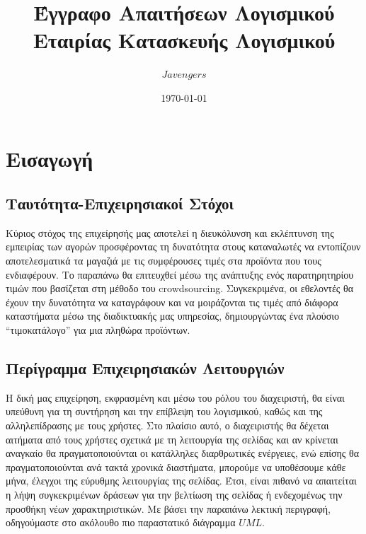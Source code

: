 \documentclass[12pt]{article}
\begin{document}
\title{Έγγραφο Απαιτήσεων Λογισμικού \\ Eταιρίας Kατασκευής Λογισμικού}
\date{\today}
\author{$Javengers$}
\maketitle

\tableofcontents

\section{Εισαγωγή}

\subsection{Ταυτότητα-Επιχειρησιακοί Στόχοι}

Κύριος στόχος της επιχείρησής μας αποτελεί η διευκόλυνση και εκλέπτυνση της εμπειρίας των αγορών προσφέροντας τη δυνατότητα στους καταναλωτές να εντοπίζουν αποτελεσματικά τα μαγαζιά με τις συμφέρουσες τιμές στα προϊόντα που τους ενδιαφέρουν. Το παραπάνω θα επιτευχθεί μέσω της ανάπτυξης ενός παρατηρητηρίου τιμών που βασίζεται στη μέθοδο του crowdsourcing. Συγκεκριμένα, οι εθελοντές θα έχουν την δυνατότητα να καταγράφουν και να μοιράζονται τις τιμές από διάφορα καταστήματα μέσω της διαδικτυακής μας υπηρεσίας, δημιουργώντας ένα πλούσιο “τιμοκατάλογο” για μια πληθώρα προϊόντων.

\subsection{Περίγραμμα Επιχειρησιακών Λειτουργιών}

Η δική μας επιχείρηση, εκφρασμένη και μέσω του ρόλου του διαχειριστή, θα είναι υπεύθυνη για τη συντήρηση και την επίβλεψη του λογισμικού, καθώς και της αλληλεπίδρασης με τους χρήστες. Στο πλαίσιο αυτό, ο διαχειριστής θα δέχεται αιτήματα από τους χρήστες σχετικά με τη λειτουργία της σελίδας και αν κρίνεται αναγκαίο θα πραγματοποιούνται οι κατάλληλες διαρθρωτικές ενέργειες, ενώ επίσης θα πραγματοποιούνται ανά τακτά χρονικά διαστήματα, μπορούμε να υποθέσουμε κάθε μήνα, έλεγχοι της εύρυθμης λειτουργίας της σελίδας. Έτσι, είναι πιθανό να απαιτείται η λήψη συγκεκριμένων δράσεων για την βελτίωση της σελίδας ή ενδεχομένως την προσθήκη νέων χαρακτηριστικών. Με βάσει την παραπάνω λεκτική περιγραφή, οδηγούμαστε στο ακόλουθο πιο παραστατικό διάγραμμα $UML$.
\end{document}
